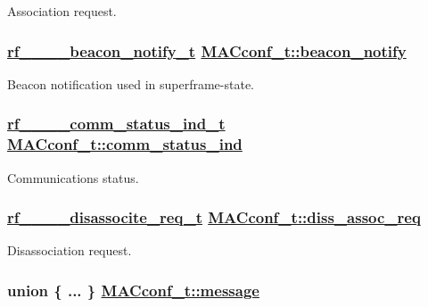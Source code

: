 Association request. \hypertarget{structMACconf__t_798614411040fccfac2f811d38f9efb4}{
\subsubsection[beacon\_\-notify]{\setlength{\rightskip}{0pt plus 5cm}\hyperlink{structrf__802__15__4__beacon__notify__t}{rf\_\_\_\_\-beacon\_\-notify\_\-t} \hyperlink{structMACconf__t_798614411040fccfac2f811d38f9efb4}{MACconf\_\-t::beacon\_\-notify}}}
\label{structMACconf__t_798614411040fccfac2f811d38f9efb4}


Beacon notification used in superframe-state. \hypertarget{structMACconf__t_d549d77083fd4e3268eb07f5253d486d}{
\subsubsection[comm\_\-status\_\-ind]{\setlength{\rightskip}{0pt plus 5cm}\hyperlink{structrf__802__15__4__comm__status__ind__t}{rf\_\_\_\_\-comm\_\-status\_\-ind\_\-t} \hyperlink{structMACconf__t_d549d77083fd4e3268eb07f5253d486d}{MACconf\_\-t::comm\_\-status\_\-ind}}}
\label{structMACconf__t_d549d77083fd4e3268eb07f5253d486d}


Communications status. \hypertarget{structMACconf__t_78aa8f60a5acacc24e18bb33458945e1}{
\subsubsection[diss\_\-assoc\_\-req]{\setlength{\rightskip}{0pt plus 5cm}\hyperlink{structrf__802__15__4__disassocite__req__t}{rf\_\_\_\_\-disassocite\_\-req\_\-t} \hyperlink{structMACconf__t_78aa8f60a5acacc24e18bb33458945e1}{MACconf\_\-t::diss\_\-assoc\_\-req}}}
\label{structMACconf__t_78aa8f60a5acacc24e18bb33458945e1}


Disassociation request. \hypertarget{structMACconf__t_6f1770beed1fc26677997b27799bb364}{
\subsubsection[message]{\setlength{\rightskip}{0pt plus 5cm}union \{ ... \}  \hyperlink{structMACconf__t_6f1770beed1fc26677997b27799bb364}{MACconf\_\-t::message}}}
\label{structMACconf__t_6f1770beed1fc26677997b27799bb364}


